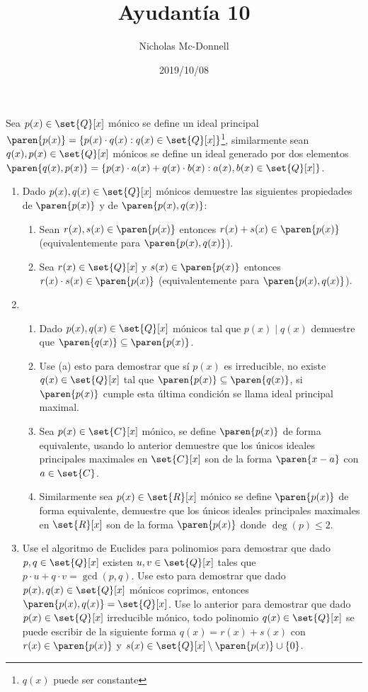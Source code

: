 \documentclass{ayudantia}
\title{Ayudantía 10}
\date{2019/10/08}
\author{Nicholas Mc-Donnell}
\begin{document}
\maketitle
Sea \(p(x)\in\set{Q}[x]\) mónico se define un ideal principal \(\paren{p(x)}=\{p(x)\cdot q(x):q(x)\in\set{Q}[x]\}\)\footnote{\(q(x)\) puede ser constante}, similarmente sean \(q(x),p(x)\in\set{Q}[x]\) mónicos se define un ideal generado por dos elementos \(\paren{q(x),p(x)}=\{p(x)\cdot a(x)+q(x)\cdot b(x):a(x),b(x)\in\set{Q}[x]\}\).
\begin{enumerate}
    \item Dado \(p(x),q(x)\in\set{Q}[x]\) mónicos demuestre las siguientes propiedades de \(\paren{p(x)}\) y de \(\paren{p(x),q(x)}\):
    \begin{enumerate}[label=(\alph*)]
        \item Sean \(r(x),s(x)\in\paren{p(x)}\) entonces \(r(x)+s(x)\in\paren{p(x)}\) (equivalentemente para \(\paren{p(x),q(x)}\)).
        \item Sea \(r(x)\in\set{Q}[x]\) y \(s(x)\in\paren{p(x)}\) entonces \(r(x)\cdot s(x)\in\paren{p(x)}\) (equivalentemente para \(\paren{p(x),q(x)}\)).
    \end{enumerate}
    \item 
    \begin{enumerate}[label=(\alph*)]
        \item Dado \(p(x),q(x)\in\set{Q}[x]\) mónicos tal que \(p(x)\mid q(x)\) demuestre que \(\paren{q(x)}\subseteq\paren{p(x)}\). 
        \item Use (a) esto para demostrar que sí \(p(x)\) es irreducible, no existe \(q(x)\in\set{Q}[x]\) tal que \(\paren{p(x)}\subseteq\paren{q(x)}\), si \(\paren{p(x)}\) cumple esta última condición se llama ideal principal maximal.
        \item Sea \(p(x)\in\set{C}[x]\) mónico, se define \(\paren{p(x)}\) de forma equivalente, usando lo anterior demuestre que los únicos ideales principales maximales en \(\set{C}[x]\) son de la forma \(\paren{x-a}\) con \(a\in\set{C}\). 
        \item Similarmente sea \(p(x)\in\set{R}[x]\) mónico se define \(\paren{p(x)}\) de forma equivalente, demuestre que los únicos ideales principales maximales en \(\set{R}[x]\) son de la forma \(\paren{p(x)}\) donde \(\deg(p)\leq 2\).
    \end{enumerate}
    \item Use el algoritmo de Euclides para polinomios para demostrar que dado \(p,q\in\set{Q}[x]\) existen \(u,v\in\set{Q}[x]\) tales que \(p\cdot u+q\cdot v=\gcd(p,q)\). Use esto para demostrar que dado \(p(x),q(x)\in\set{Q}[x]\) mónicos coprimos, entonces \(\paren{p(x),q(x)}=\set{Q}[x]\). Use lo anterior para demostrar que dado \(p(x)\in\set{Q}[x]\) irreducible mónico, todo polinomio \(q(x)\in\set{Q}[x]\) se puede escribir de la siguiente forma \(q(x)=r(x)+s(x)\) con \(r(x)\in\paren{p(x)}\) y \(s(x)\in\set{Q}[x]\setminus\paren{p(x)}\cup\{0\}\).
\end{enumerate}
\end{document}
